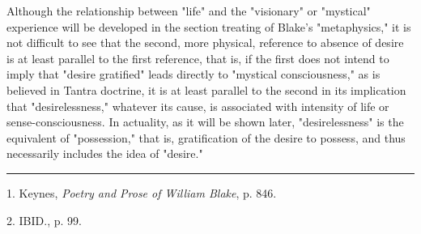 \hspace*{5mm}Although the relationship between "life" and the "visionary" or "mystical" experience will be developed in the 
section treating of Blake's "metaphysics," it is not difficult to see that the second, more physical, reference
to absence of desire is at least parallel to the first reference, that is, if the first does not intend to imply
that "desire gratified" leads directly to "mystical consciousness," as is believed in Tantra doctrine, it
is at least parallel to the second in its implication that "desirelessness," whatever its cause,
is associated with intensity of life or sense-consciousness. In actuality, as it will be shown later, "desirelessness"
is the equivalent of "possession," that is, gratification of the desire to possess, and thus necessarily includes the 
idea of "desire."\par
\vspace*{\fill}
\noindent\rule{0.25\textwidth}{0.4pt}\par
1. Keynes, \textit{Poetry and Prose of William Blake}, p. 846.\par
2. IBID., p. 99.\par

\newpage

